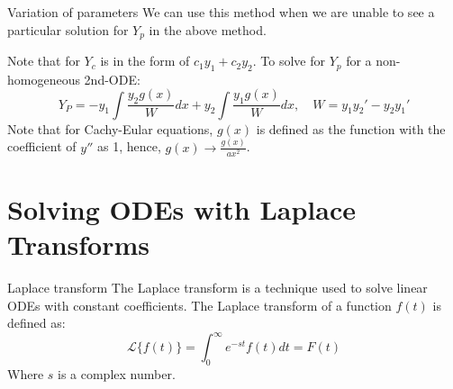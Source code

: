 \documentclass{article}
\begin{document}
\begin{theorem}
    {Variation of parameters}
    We can use this method when we are unable to see a particular solution for $Y_p$ in the above method.

    Note that for $Y_c$ is in the form of $c_1y_1+c_2y_2$.
    To solve for $Y_p$ for a non-homogeneous 2nd-ODE:
    \[Y_{P}=-y_1\int\frac{y_2g(x)}{W}dx+y_2\int\frac{y_1g(x)}{W}dx,\quad W=y_1y_2'-y_2y_1'\]
    \tcblower
    Note that for Cachy-Eular equations, $g(x)$ is defined as the function with the coefficient of $y''$ as 1, hence, $g(x)\to \frac{g(x)}{ax^2}$.
\end{theorem}

\section{Solving ODEs with Laplace Transforms}
\begin{definition}
    {Laplace transform}
    The Laplace transform is a technique used to solve linear ODEs with constant coefficients. The Laplace transform of a function $f(t)$ is defined as:
    \[\mathcal{L}\{f(t)\}=\int_{0}^{\infty}e^{-st}f(t)dt=F(t)\]
    Where $s$ is a complex number.
\end{definition}
\end{document}
